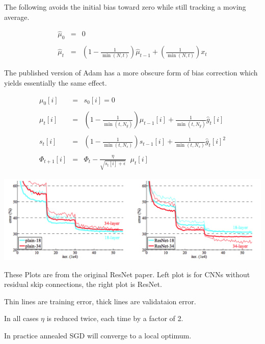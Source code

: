 {The following avoids the initial bias toward zero while still tracking a moving average.

\begin{eqnarray*}
\hat{\mu}_0 & = & 0 \\
\\
\hat{\mu}_t & = & \left(1-\frac{1}{\min(N,t)}\right)\hat{\mu}_{t-1} + \left(\frac{1}{\min(N,t)}\right)x_t
\end{eqnarray*}

\vfill
The published version of Adam has a more obscure form of bias correction which yields essentially the same effect.


\begin{eqnarray*}
  \mu_0[i] & = & s_0[i] = 0 \\
  \\
  \mu_{t}[i] & = & \left(1-\frac{1}{\min(t,N_g)}\right)\mu_{t-1}[i] + \frac{1}{\min(t,N_g)} \hat{g}_t[i] \\
  \\
  s_{t}[i] & = & \left(1-\frac{1}{\min(t,N_s)}\right)s_{t-1}[i] + \frac{1}{\min(t,N_s)} \hat{g}_t[i]^2 \\
  \\
\Phi_{t+1}[i] & =  & \Phi_t - \frac{\eta}{\sqrt{s_{t}[i] + \epsilon}}\;\;\mu_{t}[i]
\end{eqnarray*}


\centerline{\includegraphics[width = 7in]{../images/annealing}}

\vfill
These Plots are from the original ResNet paper.  Left plot is for CNNs without residual skip connections, the right plot is ResNet.

\vfill
Thin lines are training error, thick lines are validataion error.

\vfill
In all cases $\eta$ is reduced twice, each time by a factor of 2.


\vfill
In practice annealed SGD will converge to a local optimum.

}
